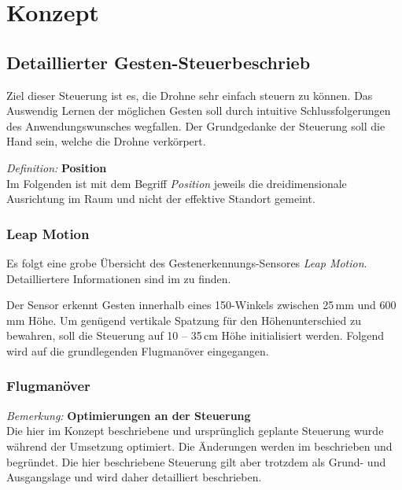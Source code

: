\chapter{Konzept}

\section{Detaillierter Gesten-Steuerbeschrieb}
\label{sec:gestureControll}

Ziel dieser Steuerung ist es, die Drohne sehr einfach steuern zu können.
Das Auswendig Lernen der möglichen Gesten soll durch intuitive Schlussfolgerungen des Anwendungswunsches wegfallen.
Der Grundgedanke der Steuerung soll die Hand sein, welche die Drohne verkörpert.

\begin{framed}
\textit{Definition: }\textbf{Position}\\
Im Folgenden ist mit dem Begriff \textit{Position} jeweils die dreidimensionale Ausrichtung im Raum und nicht der effektive Standort gemeint.
\end{framed}

\subsection{Leap Motion}
Es folgt eine grobe Übersicht des Gestenerkennungs-Sensores \textit{Leap Motion}.
Detailliertere Informationen sind im  zu finden.

Der Sensor erkennt Gesten innerhalb eines 150\textdegree-Winkels zwischen 25\,mm und 600\,mm Höhe.
Um genügend vertikale Spatzung für den Höhenunterschied zu bewahren, soll die Steuerung auf 10 --  35\,cm Höhe initialisiert werden.
Folgend wird auf die grundlegenden Flugmanöver eingegangen.

\subsection{Flugmanöver}
\begin{framed}
	\textit{Bemerkung: }\textbf{Optimierungen an der Steuerung}\\
	Die hier im Konzept beschriebene und ursprünglich geplante Steuerung wurde während der Umsetzung optimiert. Die Änderungen werden im  beschrieben und begründet. Die hier beschriebene Steuerung gilt aber trotzdem als Grund- und Ausgangslage und wird daher detailliert beschrieben.
\end{framed}

